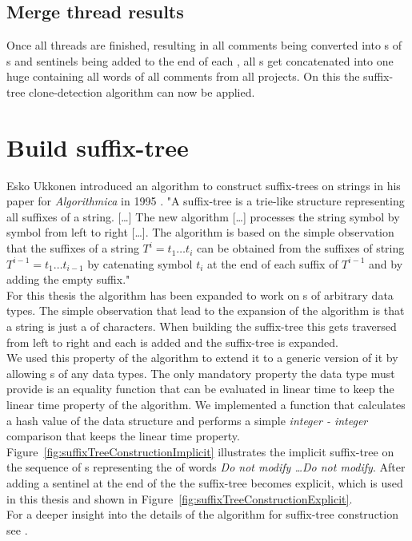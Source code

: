 \subsection{Merge thread results}
Once all threads are finished, resulting in all comments being converted into s of s and sentinels being added to the end of each , all s get concatenated into one huge  containing all words of all comments from all projects. On this  the suffix-tree clone-detection algorithm can now be applied.

\section{Build suffix-tree}
Esko Ukkonen introduced an algorithm to construct suffix-trees on strings in his paper for \textit{Algorithmica} in 1995 \cite{Ukkonen1995}. "A suffix-tree is a trie-like structure representing all suffixes of a string. [\dots] The new algorithm [\dots] processes the string symbol by symbol from left to right [\dots]. The algorithm is based on the simple observation that the suffixes of a string $T^i = t_1 \dots t_i$ can be obtained from the suffixes of string $T^{i-1} = t_1 \dots t_{i-1}$ by catenating symbol $t_i$ at the end of each suffix of $T^{i-1}$ and by adding the empty suffix."~\cite[p.~2]{Ukkonen1995}\\
For this thesis the algorithm has been expanded to work on s of arbitrary data types. The simple observation that lead to the expansion of the algorithm is that a string is just a  of characters. When building the suffix-tree this  gets traversed from left to right and each  is added and the suffix-tree is expanded.\\
We used this property of the algorithm to extend it to a generic version of it by allowing s of any data types. The only mandatory property the data type must provide is an equality function that can be evaluated in linear time to keep the linear time property of the algorithm. We implemented a function that calculates a hash value of the data structure and performs a simple \textit{integer - integer} comparison that keeps the linear time property.\\
Figure~\ref{fig:suffixTreeConstructionImplicit} illustrates the implicit suffix-tree on the sequence of s representing the  of words \textit{Do not modify \dots Do not modify}. After adding a sentinel at the end of the  the suffix-tree becomes explicit, which is used in this thesis and shown in Figure~\ref{fig:suffixTreeConstructionExplicit}.\\
For a deeper insight into the details of the algorithm for suffix-tree construction see \cite{Ukkonen1995}. 



